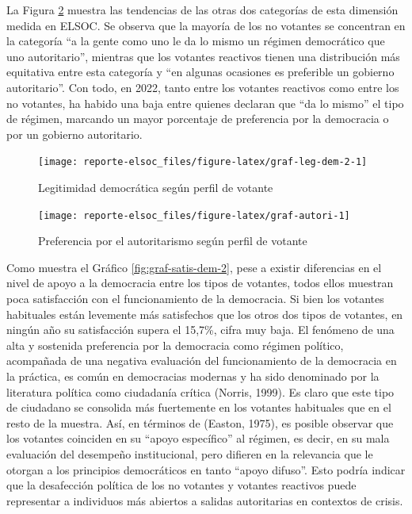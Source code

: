\documentclass[
  12pt,
]{book}
\begin{document}
La Figura \ref{fig:graf-autori} muestra las tendencias de las otras dos categorías de esta dimensión medida en ELSOC. Se observa que la mayoría de los no votantes se concentran en la categoría ``a la gente como uno le da lo mismo un régimen democrático que uno autoritario'', mientras que los votantes reactivos tienen una distribución más equitativa entre esta categoría y ``en algunas ocasiones es preferible un gobierno autoritario''. Con todo, en 2022, tanto entre los votantes reactivos como entre los no votantes, ha habido una baja entre quienes declaran que ``da lo mismo'' el tipo de régimen, marcando un mayor porcentaje de preferencia por la democracia o por un gobierno autoritario.

\begin{figure}

{\centering \texttt{[image: reporte-elsoc\_files/figure-latex/graf-leg-dem-2-1]} 

}

\caption{Legitimidad democrática según perfil de votante}\label{fig:graf-leg-dem-2}
\end{figure}

\begin{figure}

{\centering \texttt{[image: reporte-elsoc\_files/figure-latex/graf-autori-1]} 

}

\caption{Preferencia por el autoritarismo según perfil de votante}\label{fig:graf-autori}
\end{figure}

Como muestra el Gráfico \ref{fig:graf-satis-dem-2}, pese a existir diferencias en el nivel de apoyo a la democracia entre los tipos de votantes, todos ellos muestran poca satisfacción con el funcionamiento de la democracia. Si bien los votantes habituales están levemente más satisfechos que los otros dos tipos de votantes, en ningún año su satisfacción supera el 15,7\%, cifra muy baja. El fenómeno de una alta y sostenida preferencia por la democracia como régimen político, acompañada de una negativa evaluación del funcionamiento de la democracia en la práctica, es común en democracias modernas y ha sido denominado por la literatura política como ciudadanía crítica (Norris, 1999). Es claro que este tipo de ciudadano se consolida más fuertemente en los votantes habituales que en el resto de la muestra. Así, en términos de (Easton, 1975), es posible observar que los votantes coinciden en su ``apoyo específico'' al régimen, es decir, en su mala evaluación del desempeño institucional, pero difieren en la relevancia que le otorgan a los principios democráticos en tanto ``apoyo difuso''. Esto podría indicar que la desafección política de los no votantes y votantes reactivos puede representar a individuos más abiertos a salidas autoritarias en contextos de crisis.
\end{document}

